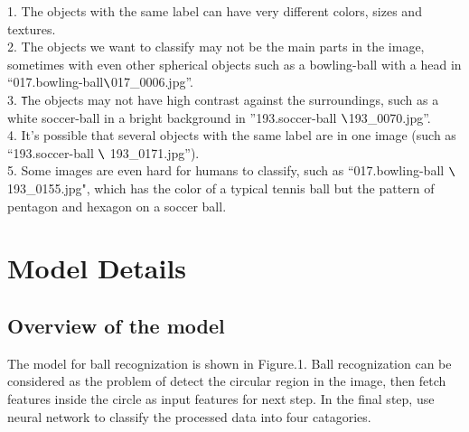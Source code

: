 \documentclass{article}
\begin{document}
1. The objects with the same label can have very different colors, sizes and textures.\\
2. The objects we want to classify may not be the main parts in the image, sometimes with even other spherical objects
such as a bowling-ball with a head in ``017.bowling-ball$ \verb|\|$017\_0006.jpg''.\\
3. \texttt{T}he objects may not have high contrast against the surroundings, such as a white soccer-ball in a bright background in ''193.soccer-ball $ \verb|\|$193\_0070.jpg''.\\
4. It's possible that several objects with the same label are in one image (such as ``193.soccer-ball $ \verb|\|$ 193\_0171.jpg'').\\
5. Some images are even hard for humans to classify, such as ``017.bowling-ball $ \verb|\|$ 193\_0155.jpg", which has the color of a typical tennis ball but the pattern of pentagon and hexagon on a soccer ball.\\


\section{Model Details} 


\subsection{Overview of the model}
The model for ball recognization is shown in Figure.1. Ball recognization can be considered as the problem of detect the circular region in the image, then fetch features inside the circle as input features for next step. In the final step, use neural network to classify the processed data into four catagories.\\
\end{document}
